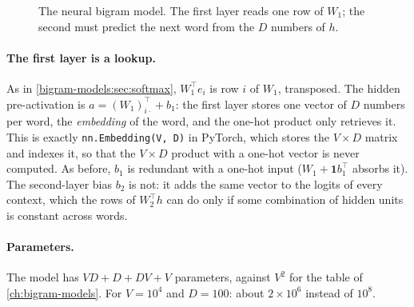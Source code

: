 \begin{notechapter}
\begin{figure}[ht]
\centering
{}
\caption{The neural bigram model. The first layer reads one row of $W_1$; the second must predict the
next word from the $D$ numbers of $h$.}
\label{bigram-neural:fig:model}
\end{figure}

\paragraph{The first layer is a lookup.} As in \cref{bigram-models:sec:softmax}, $W_1^\top e_i$ is row $i$ of $W_1$, transposed.
The hidden pre-activation is $a = (W_1)_{i\cdot}^\top + b_1$: the first layer stores one vector of $D$ numbers per word,
the \emph{embedding} of the word, and the one-hot product only retrieves it. This is exactly
\texttt{nn.Embedding(V, D)} in PyTorch, which stores the $V\times D$ matrix and indexes it, so that
the $V\times D$ product with a one-hot vector is never computed. As before, $b_1$ is redundant with a one-hot
input ($W_1 + \mathbf 1b_1^\top$ absorbs it). The second-layer bias $b_2$ is not: it adds the same vector to the
logits of every context, which the rows of $W_2^\top h$ can do only if some combination of hidden units is
constant across words.

\paragraph{Parameters.} The model has $VD + D + DV + V$ parameters, against $V^2$ for the table of
\cref{ch:bigram-models}. For $V = 10^4$ and $D = 100$: about $2\times10^6$ instead of $10^8$.


\end{notechapter}
